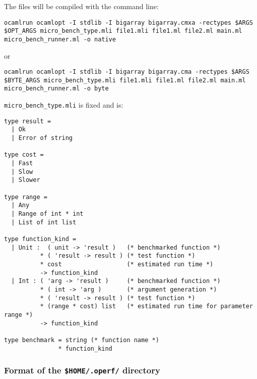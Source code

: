 \documentclass[11pt,a4paper]{article}
\begin{document}
The files will be compiled with the command line:
\begin{verbatim}
ocamlrun ocamlopt -I stdlib -I bigarray bigarray.cmxa -rectypes $ARGS $OPT_ARGS micro_bench_type.mli file1.mli file1.ml file2.ml main.ml micro_bench_runner.ml -o native
\end{verbatim}
or
\begin{verbatim}
ocamlrun ocamlopt -I stdlib -I bigarray bigarray.cma -rectypes $ARGS $BYTE_ARGS micro_bench_type.mli file1.mli file1.ml file2.ml main.ml micro_bench_runner.ml -o byte
\end{verbatim}


{\tt micro\_bench\_type.mli} is fixed and is:
\begin{verbatim}
type result =
  | Ok
  | Error of string

type cost =
  | Fast
  | Slow
  | Slower

type range =
  | Any
  | Range of int * int
  | List of int list

type function_kind =
  | Unit :  ( unit -> 'result )   (* benchmarked function *)
          * ( 'result -> result ) (* test function *)
          * cost                  (* estimated run time *)
          -> function_kind
  | Int : ( 'arg -> 'result )     (* benchmarked function *)
          * ( int -> 'arg )       (* argument generation *)
          * ( 'result -> result ) (* test function *)
          * (range * cost) list   (* estimated run time for parameter range *)
          -> function_kind

type benchmark = string (* function name *)
               * function_kind
\end{verbatim}


\subsubsection{Format of the {\tt \$HOME/.operf/} directory}
\end{document}
